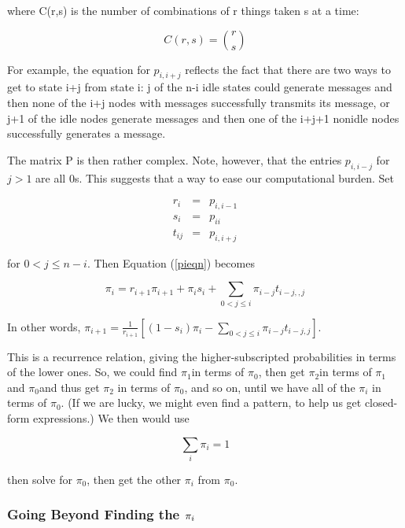 \documentclass[11pt]{article}
\begin{document}
where C(r,s) is the number of combinations of r things taken s at a
time:

\begin{equation}
C(r,s) = \binom{r}{s}
\end{equation}

For example, the equation for $p_{i,i+j}$ reflects the fact that there
are two ways to get to state i+j from state i: j of the n-i idle states could
generate messages and then none of the i+j nodes with messages successfully
transmits its message, or j+1 of the idle nodes generate messages and then one
of the i+j+1 nonidle nodes successfully generates a message.

The matrix P is then rather complex. Note, however, that the entries
$p_{i,i-j}$ for $j > 1$ are all 0s. This suggests that a way to ease our
computational burden.  Set

\begin{eqnarray}
r_{i} & = & p_{i,i-1}\\
s_{i} & = & p_{ii}\\
t_{ij} & = & p_{i,i+j}
\end{eqnarray}

for $0<j\leq n-i$. Then Equation (\ref{pieqn}) becomes

\begin{equation}
\pi_{i}=r_{i+1}\pi_{i+1}+\pi_{i}s_{i}+\sum_{0<j\leq i}\pi_{i-j}t_{i-j,,j}
\end{equation}


In other words,
$\pi_{i+1}
=
\frac{1}{r_{i+1}}
[(1-s_{i})\pi_{i}-\sum_{0<j\leq i}\pi_{i-j}t_{i-j,j}]
$.

This is a recurrence relation, giving the higher-subscripted
probabilities in terms of the lower ones.  So, we could find $\pi_1$in
terms of $\pi_0$, then get $\pi_2$in terms of $\pi_1$and $\pi_0$and
thus get $\pi_2$ in terms of $\pi_0$, and so on, until we have all of
the $\pi_i$ in terms of $\pi_0$.  (If we are lucky, we might even find
a pattern, to help us get closed-form expressions.)  We then would use 

\begin{equation}
\sum_{i}\pi_{i}=1
\end{equation}  

then solve for $\pi_0$, then get the other $\pi_i$ from $\pi_0$.

\subsubsection{Going Beyond Finding the \protect\protect\protect$\pi_{i}\protect \protect \protect $}
\label{firstib}
\end{document}
